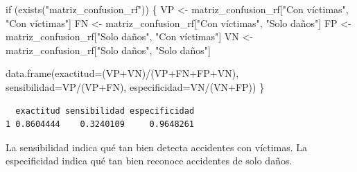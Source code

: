 \documentclass[
  spanish,
  11pt,
  letterpaper,
]{book}
\newenvironment{Shaded}{}{}
\newcommand{\AttributeTok}[1]{\textcolor[rgb]{0.84,0.23,0.29}{#1}}
\newcommand{\ControlFlowTok}[1]{\textcolor[rgb]{0.84,0.23,0.29}{#1}}
\newcommand{\FunctionTok}[1]{\textcolor[rgb]{0.44,0.26,0.76}{#1}}
\newcommand{\NormalTok}[1]{\textcolor[rgb]{0.14,0.16,0.18}{#1}}
\newcommand{\OtherTok}[1]{\textcolor[rgb]{0.44,0.26,0.76}{#1}}
\newcommand{\SpecialCharTok}[1]{\textcolor[rgb]{0.00,0.36,0.77}{#1}}
\newcommand{\StringTok}[1]{\textcolor[rgb]{0.01,0.18,0.38}{#1}}
\begin{document}
\begin{Shaded}
\begin{Highlighting}[]
\ControlFlowTok{if}\NormalTok{ (}\FunctionTok{exists}\NormalTok{(}\StringTok{"matriz\_confusion\_rf"}\NormalTok{)) \{}
\NormalTok{  VP }\OtherTok{\textless{}{-}}\NormalTok{ matriz\_confusion\_rf[}\StringTok{"Con víctimas"}\NormalTok{, }\StringTok{"Con víctimas"}\NormalTok{]}
\NormalTok{  FN }\OtherTok{\textless{}{-}}\NormalTok{ matriz\_confusion\_rf[}\StringTok{"Con víctimas"}\NormalTok{, }\StringTok{"Solo daños"}\NormalTok{]}
\NormalTok{  FP }\OtherTok{\textless{}{-}}\NormalTok{ matriz\_confusion\_rf[}\StringTok{"Solo daños"}\NormalTok{, }\StringTok{"Con víctimas"}\NormalTok{]}
\NormalTok{  VN }\OtherTok{\textless{}{-}}\NormalTok{ matriz\_confusion\_rf[}\StringTok{"Solo daños"}\NormalTok{, }\StringTok{"Solo daños"}\NormalTok{]}

  \FunctionTok{data.frame}\NormalTok{(}\AttributeTok{exactitud=}\NormalTok{(VP}\SpecialCharTok{+}\NormalTok{VN)}\SpecialCharTok{/}\NormalTok{(VP}\SpecialCharTok{+}\NormalTok{FN}\SpecialCharTok{+}\NormalTok{FP}\SpecialCharTok{+}\NormalTok{VN), }\AttributeTok{sensibilidad=}\NormalTok{VP}\SpecialCharTok{/}\NormalTok{(VP}\SpecialCharTok{+}\NormalTok{FN), }\AttributeTok{especificidad=}\NormalTok{VN}\SpecialCharTok{/}\NormalTok{(VN}\SpecialCharTok{+}\NormalTok{FP))}
\NormalTok{\}}
\end{Highlighting}
\end{Shaded}

\begin{verbatim}
  exactitud sensibilidad especificidad
1 0.8604444    0.3240109     0.9648261
\end{verbatim}

\begin{tcolorbox}[enhanced jigsaw, arc=.35mm, bottomrule=.15mm, bottomtitle=1mm, breakable, colback=white, colbacktitle=quarto-callout-tip-color!10!white, colframe=quarto-callout-tip-color-frame, coltitle=black, left=2mm, leftrule=.75mm, opacityback=0, opacitybacktitle=0.6, rightrule=.15mm, title=\textcolor{quarto-callout-tip-color}{\faLightbulb}\hspace{0.5em}{Interpretación del resultado}, titlerule=0mm, toprule=.15mm, toptitle=1mm]

La sensibilidad indica qué tan bien detecta accidentes con víctimas. La
especificidad indica qué tan bien reconoce accidentes de solo daños.

\end{tcolorbox}
\end{document}
